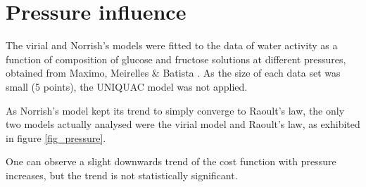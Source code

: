 \documentclass[
	12pt,				%
	openright,
	twoside,
	a4paper,			%
	brazil,			%
	french,				%
	english				%
	]{abntex2}
\begin{document}
\section{Pressure influence}

The virial and Norrish's models were fitted to the data of water activity as
a function of composition of glucose and fructose solutions at different
pressures, obtained from Maximo, Meirelles \& Batista \cite{maximo2010}.
As the size of each data set was small (5 points), the UNIQUAC model was not
applied.

As Norrish's model kept its trend to simply converge to Raoult's law,
the only two models actually analysed were the virial model and Raoult's law,
as exhibited in figure \ref{fig_pressure}.

One can observe a slight downwards trend of the cost function with pressure
increases, but the trend is not statistically significant.
\end{document}
